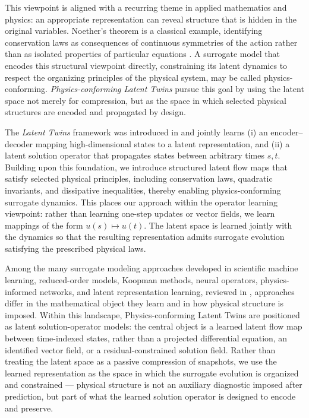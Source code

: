 \documentclass[a4paper,fleqn]{cas-sc}
\theoremstyle{thmstyleone}%
\theoremstyle{thmstyletwo}%
\theoremstyle{thmstylethree}%
\begin{document}
This viewpoint is aligned with a recurring theme in applied mathematics and physics: an appropriate representation can reveal structure that is hidden in the original variables. Noether's theorem is a classical example, identifying conservation laws as consequences of continuous symmetries of the action rather than as isolated properties of particular equations \cite{noether1918invarianten,noether1983invariante}. A surrogate model that encodes this structural viewpoint directly, constraining its latent dynamics to respect the organizing principles of the physical system, may be called physics-conforming. \emph{Physics-conforming Latent Twins} pursue this goal by using the latent space not merely for compression, but as the space in which selected physical structures are encoded and propagated by design.

The \emph{Latent Twins} framework was introduced in \cite{chung2026latent} and jointly learns (i) an encoder--decoder mapping high-dimensional states to a latent representation, and (ii) a latent solution operator that propagates states between arbitrary times $s,t$. Building upon this foundation, we introduce structured latent flow maps that satisfy selected physical principles, including conservation laws, quadratic invariants, and dissipative inequalities, thereby enabling physics-conforming surrogate dynamics. This places our approach within the operator learning viewpoint: rather than learning one-step updates or vector fields, we learn mappings of the form $u(s) \mapsto u(t)$. The latent space is learned jointly with the dynamics so that the resulting representation admits surrogate evolution satisfying the prescribed physical laws.

Among the many surrogate modeling approaches developed in scientific machine learning, reduced-order models, Koopman methods, neural operators, physics-informed networks, and latent representation learning, reviewed in , approaches differ in the mathematical object they learn and in how physical structure is imposed. Within this landscape, Physics-conforming Latent Twins are positioned as latent solution-operator models: the central object is a learned latent flow map between time-indexed states, rather than a projected differential equation, an identified vector field, or a residual-constrained solution field. Rather than treating the latent space as a passive compression of snapshots, we use the learned representation as the space in which the surrogate evolution is organized and constrained — physical structure is not an auxiliary diagnostic imposed after prediction, but part of what the learned solution operator is designed to encode and preserve.
\end{document}
